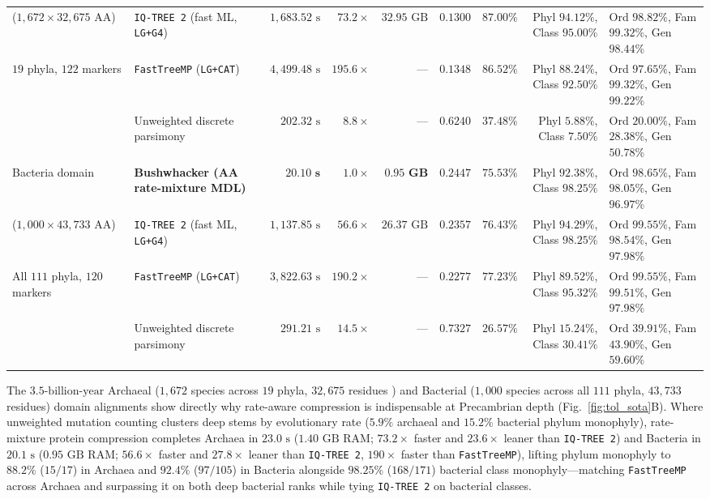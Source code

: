 \documentclass[11pt,a4paper]{article}
\begin{document}
\begin{table}[t!]
{\begin{tabular}{@{}llrrrrrrl@{}}
($1{,}672 \times 32{,}675\text{ AA}$) & \texttt{IQ-TREE 2} (fast ML, \texttt{LG+G4}) & $1{,}683.52\text{ s}$ & $73.2\times$ & $32.95\text{ GB}$ & $0.1300$ & $87.00\%$ & Phyl $94.12\%$, Class $95.00\%$ & Ord $98.82\%$, Fam $99.32\%$, Gen $98.44\%$ \\
$19$ phyla, $122$ markers & \texttt{FastTreeMP} (\texttt{LG+CAT}) & $4{,}499.48\text{ s}$ & $195.6\times$ & --- & $0.1348$ & $86.52\%$ & Phyl $88.24\%$, Class $92.50\%$ & Ord $97.65\%$, Fam $99.32\%$, Gen $99.22\%$ \\
 & Unweighted discrete parsimony & $202.32\text{ s}$ & $8.8\times$ & --- & $0.6240$ & $37.48\%$ & Phyl $5.88\%$, Class $7.50\%$ & Ord $20.00\%$, Fam $28.38\%$, Gen $50.78\%$ \\
\midrule
Bacteria domain & \textbf{Bushwhacker (AA rate-mixture MDL)} & $\mathbf{20.10\text{ s}}$ & $\mathbf{1.0\times}$ & $\mathbf{0.95\text{ GB}}$ & $0.2447$ & $75.53\%$ & Phyl $\mathbf{92.38\%}$, Class $\mathbf{98.25\%}$ & Ord $98.65\%$, Fam $98.05\%$, Gen $96.97\%$ \\
($1{,}000 \times 43{,}733\text{ AA}$) & \texttt{IQ-TREE 2} (fast ML, \texttt{LG+G4}) & $1{,}137.85\text{ s}$ & $56.6\times$ & $26.37\text{ GB}$ & $0.2357$ & $76.43\%$ & Phyl $94.29\%$, Class $98.25\%$ & Ord $99.55\%$, Fam $98.54\%$, Gen $97.98\%$ \\
All $111$ phyla, $120$ markers & \texttt{FastTreeMP} (\texttt{LG+CAT}) & $3{,}822.63\text{ s}$ & $190.2\times$ & --- & $0.2277$ & $77.23\%$ & Phyl $89.52\%$, Class $95.32\%$ & Ord $99.55\%$, Fam $99.51\%$, Gen $97.98\%$ \\
 & Unweighted discrete parsimony & $291.21\text{ s}$ & $14.5\times$ & --- & $0.7327$ & $26.57\%$ & Phyl $15.24\%$, Class $30.41\%$ & Ord $39.91\%$, Fam $43.90\%$, Gen $59.60\%$ \\
\bottomrule
\end{tabular}%
}
\end{table}

The $3.5\text{-billion-year}$ Archaeal ($1,672$ species across $19$ phyla, $32,675$ residues \citep{parks2020gtdb}) and Bacterial ($1,000$ species across all $111$ phyla, $43,733$ residues) domain alignments show directly why rate-aware compression is indispensable at Precambrian depth (Fig.~\ref{fig:tol_sota}B). Where unweighted mutation counting clusters deep stems by evolutionary rate ($5.9\%$ archaeal and $15.2\%$ bacterial phylum monophyly), rate-mixture protein compression completes Archaea in $23.0\text{ s}$ ($1.40\text{ GB}$ RAM; $73.2\times$ faster and $23.6\times$ leaner than \texttt{IQ-TREE 2}) and Bacteria in $20.1\text{ s}$ ($0.95\text{ GB}$ RAM; $56.6\times$ faster and $27.8\times$ leaner than \texttt{IQ-TREE 2}, $190\times$ faster than \texttt{FastTreeMP}), lifting phylum monophyly to $88.2\%$ ($15/17$) in Archaea and $92.4\%$ ($97/105$) in Bacteria alongside $98.25\%$ ($168/171$) bacterial class monophyly---matching \texttt{FastTreeMP} across Archaea and surpassing it on both deep bacterial ranks while tying \texttt{IQ-TREE 2} on bacterial classes.
\end{document}
